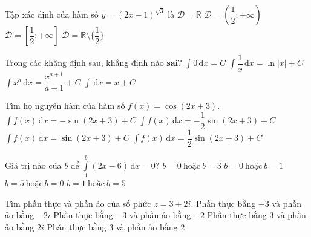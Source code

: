\begin{ex}%
	Tập xác định của hàm số $y=(2x-1)^{\sqrt{3}}$ là
	\choice
	{ $\mathscr{D}=\mathbb{R}$}
	{\True $\mathscr{D}=\left(\dfrac{1}{2};+\infty\right)$}
	{$\mathscr{D}=\left[\dfrac{1}{2};+\infty \right]$}
	{$\mathscr{D}=\mathbb{R}\setminus \Big\lbrace\dfrac{1}{2}\Big\rbrace $}
\end{ex}
\begin{ex}%
	Trong các khẳng định sau, khẳng định nào \textbf{sai}?
		\choice
		{ $\displaystyle \int 0 \mathrm{\, d}x=C$}
		{ $\displaystyle\int  \dfrac{1}{x}\mathrm{\, d}x=\ln|x| +C$}
		{\True $\displaystyle\int  x^a \mathrm{\, d}x =\dfrac{x^{a+1}}{a+1}+C$}
		{ $\displaystyle\int \mathrm{\, d}x =x+C$}	

\end{ex}

\begin{ex}%
	Tìm họ nguyên hàm của hàm số $f(x)=\cos (2x+3).$
	\choice
	{$\displaystyle\int f(x) \mathrm{\, d}x=-\sin (2x+3)+C$}
	{$\displaystyle\int f(x) \mathrm{\, d}x=-\dfrac{1}{2}\sin (2x+3)+C $}
	{$\displaystyle\int f(x) \mathrm{\, d}x=\sin (2x+3)+C$}
	{\True $\displaystyle\int f(x) \mathrm{\, d}x=\dfrac{1}{2}\sin (2x+3)+C$}
\end{ex}

\begin{ex}%
	Giá trị nào của $b$ để $\displaystyle\int\limits_1^b (2x-6)\mathrm{\, d}x=0 ?$
	\choice
	{$b=0 \ \text{hoặc}\  b=3$}
	{$b=0 \ \text{hoặc}\   b=1$}
	{$b=5\ \text{hoặc}\ b=0$}
	{\True $b=1 \ \text{hoặc}\ b=5$}
\end{ex}
\begin{ex}%
	Tìm phần thực và phần ảo của số phức $z=3+2i.$
	\choice
	{ Phần thực bằng $-3$ và phần ảo bằng $-2i$}
{ Phần thực bằng $-3$ và phần ảo bằng $-2$}
{ Phần thực bằng $3$ và phần ảo bằng $2i$}
	{\True  Phần thực bằng $3$ và phần ảo bằng $2$}
\end{ex}

